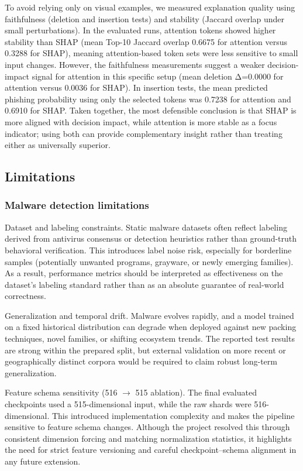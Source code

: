 \documentclass[conference]{IEEEtran}
\begin{document}
To avoid relying only on visual examples, we measured explanation quality using faithfulness (deletion and insertion tests) and stability (Jaccard overlap under small perturbations). In the evaluated runs, attention tokens showed higher stability than SHAP (mean Top-10 Jaccard overlap 0.6675 for attention versus 0.3288 for SHAP), meaning attention-based token sets were less sensitive to small input changes. However, the faithfulness measurements suggest a weaker decision-impact signal for attention in this specific setup (mean deletion Δ=0.0000 for attention versus 0.0036 for SHAP). In insertion tests, the mean predicted phishing probability using only the selected tokens was 0.7238 for attention and 0.6910 for SHAP. Taken together, the most defensible conclusion is that SHAP is more aligned with decision impact, while attention is more stable as a focus indicator; using both can provide complementary insight rather than treating either as universally superior.

\subsection{Limitations}

\subsubsection{Malware detection limitations}

Dataset and labeling constraints. Static malware datasets often reflect labeling derived from antivirus consensus or detection heuristics rather than ground-truth behavioral verification. This introduces label noise risk, especially for borderline samples (potentially unwanted programs, grayware, or newly emerging families). As a result, performance metrics should be interpreted as effectiveness on the dataset’s labeling standard rather than as an absolute guarantee of real-world correctness.

Generalization and temporal drift. Malware evolves rapidly, and a model trained on a fixed historical distribution can degrade when deployed against new packing techniques, novel families, or shifting ecosystem trends. The reported test results are strong within the prepared split, but external validation on more recent or geographically distinct corpora would be required to claim robust long-term generalization.

Feature schema sensitivity (516 $\rightarrow$ 515 ablation). The final evaluated checkpoints used a 515-dimensional input, while the raw shards were 516-dimensional. This introduced implementation complexity and makes the pipeline sensitive to feature schema changes. Although the project resolved this through consistent dimension forcing and matching normalization statistics, it highlights the need for strict feature versioning and careful checkpoint--schema alignment in any future extension.
\end{document}
